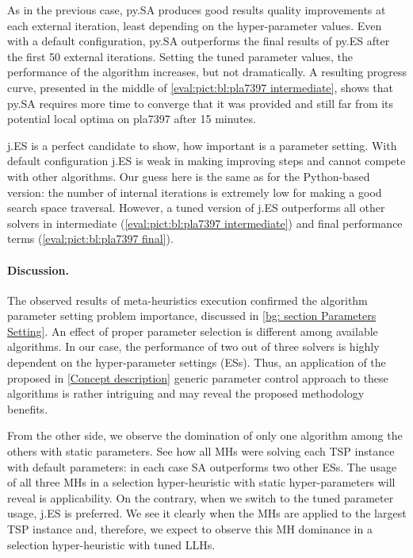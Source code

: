 As in the previous case, py.SA produces good results quality improvements at each external iteration, least depending on the hyper-parameter values. Even with a default configuration, py.SA outperforms the final results of py.ES after the first 50 external iterations. Setting the tuned parameter values, the performance of the algorithm increases, but not dramatically. A resulting progress curve, presented in the middle of \cref{eval:pict:bl:pla7397 intermediate}, shows that py.SA requires more time to converge that it was provided and still far from its potential local optima on pla7397 after 15 minutes.

j.ES is a perfect candidate to show, how important is a parameter setting. With default configuration j.ES is weak in making improving steps and cannot compete with other algorithms. Our guess here is the same as for the Python-based version: the number of internal iterations is extremely low for making a good search space traversal. However, a tuned version of j.ES outperforms all other solvers in intermediate (\cref{eval:pict:bl:pla7397 intermediate}) and final performance terms (\cref{eval:pict:bl:pla7397 final}).


\paragraph{Discussion.} The observed results of meta-heuristics execution confirmed the algorithm parameter setting problem importance, discussed in \cref{bg: section Parameters Setting}. An effect of proper parameter selection is different among available algorithms. In our case, the performance of two out of three solvers is highly dependent on the hyper-parameter settings (ESs). Thus, an application of the proposed in \cref{Concept description} generic parameter control approach to these algorithms is rather intriguing and may reveal the proposed methodology benefits.

From the other side, we observe the domination of only one algorithm among the others with static parameters. See how all MHs were solving each TSP instance with default parameters: in each case SA outperforms two other ESs. The usage of all three MHs in a selection hyper-heuristic with static hyper-parameters will reveal is applicability. On the contrary, when we switch to the tuned parameter usage, j.ES is preferred. We see it clearly when the MHs are applied to the largest TSP instance and, therefore, we expect to observe this MH dominance in a selection hyper-heuristic with tuned LLHs.

